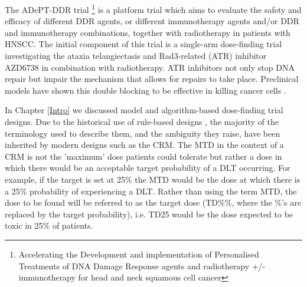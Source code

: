 The ADePT-DDR trial \footnote{Accelerating the Development and implementation of Personalised Treatments of DNA Damage Response agents and radiotherapy +/- immunotherapy for head and neck squamous cell cancer } is a platform trial which aims to evaluate the safety and efficacy of different DDR agents, or different immunotherapy agents and/or DDR and immunotherapy combinations, together with radiotherapy in patients with HNSCC. The initial component of this trial is a single-arm dose-finding trial investigating the ataxia telangiectasis and Rad3-related (ATR) inhibitor AZD6738 in combination with radiotherapy. ATR inhibitors not only stop DNA repair but impair the mechanism that allows for repairs to take place. Preclinical models have shown this double blocking to be effective in killing cancer cells \cite{meiAtaxiaTelangiectasiaRad3related2019}. 

In Chapter \ref{Intro} we discussed model and algorithm-based dose-finding trial designs. Due to the historical use of rule-based designs \cite{rogatkoTranslationInnovativeDesigns2007, chiuzanDosefindingDesignsTrials2017}, the majority of the terminology used to describe them, and the ambiguity they raise, have been inherited by modern designs such as the CRM. The MTD in the context of a CRM is not the 'maximum' dose patients could tolerate but rather a dose in which there would be an acceptable target probability of a DLT occurring. For example, if the target is set at 25\% the MTD would be the dose at which there is a 25\% probability of experiencing a DLT. Rather than using the term MTD, the dose to be found will be referred to as the target dose (TD\%\%, where the \%'s are replaced by the target probability), i.e. TD25 would be the dose expected to be toxic in 25\% of patients.

